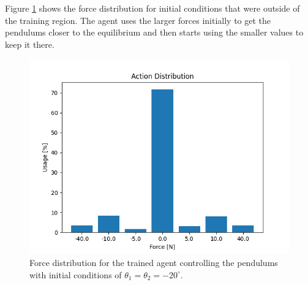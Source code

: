 \documentclass[final]{LTHtwocol} %
\begin{document}
Figure \ref{fig:double_pendulum_force_dist} shows the force distribution for initial conditions that were outside of the training region.
The agent uses the larger forces initially to get the pendulums closer to the equilibrium and then starts using the smaller values to keep it there.
\begin{figure}[htp]
	\centering
	\includegraphics[width=0.9\columnwidth]{figures/DoublePendulum_Force_Dist.png}
	\caption{Force distribution for the trained agent controlling the pendulums with initial conditions of $\theta_1=\theta_2=-20^{\circ}$.}
	\label{fig:double_pendulum_force_dist}
\end{figure}
\end{document}
